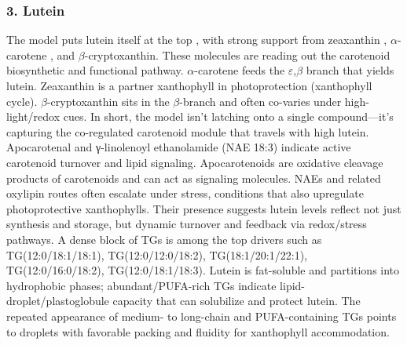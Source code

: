 \documentclass[10pt,letterpaper]{article}
\begin{document}
\subsubsection*{3. Lutein} 
The model puts lutein itself at the top , with strong support from zeaxanthin , $\alpha$-carotene , and $\beta$-cryptoxanthin. These molecules are reading out the carotenoid biosynthetic and functional pathway. $\alpha$-carotene feeds the $\varepsilon$,$\beta$ branch that yields lutein. Zeaxanthin is a partner xanthophyll in photoprotection (xanthophyll cycle). $\beta$-cryptoxanthin sits in the $\beta$-branch and often co-varies under high-light/redox cues. In short, the model isn’t latching onto a single compound—it’s capturing the co-regulated carotenoid module that travels with high lutein.
Apocarotenal and γ-linolenoyl ethanolamide (NAE 18:3) indicate active carotenoid turnover and lipid signaling. Apocarotenoids are oxidative cleavage products of carotenoids and can act as signaling molecules. NAEs and related oxylipin routes often escalate under stress, conditions that also upregulate photoprotective xanthophylls. Their presence suggests lutein levels reflect not just synthesis and storage, but dynamic turnover and feedback via redox/stress pathways.
A dense block of TGs is among the top drivers such as TG(12:0/18:1/18:1), TG(12:0/12:0/18:2), TG(18:1/20:1/22:1), TG(12:0/16:0/18:2), TG(12:0/18:1/18:3). Lutein is fat-soluble and partitions into hydrophobic phases; abundant/PUFA-rich TGs indicate lipid-droplet/plastoglobule capacity that can solubilize and protect lutein. The repeated appearance of medium- to long-chain and PUFA-containing TGs points to droplets with favorable packing and fluidity for xanthophyll accommodation.


\end{document}
